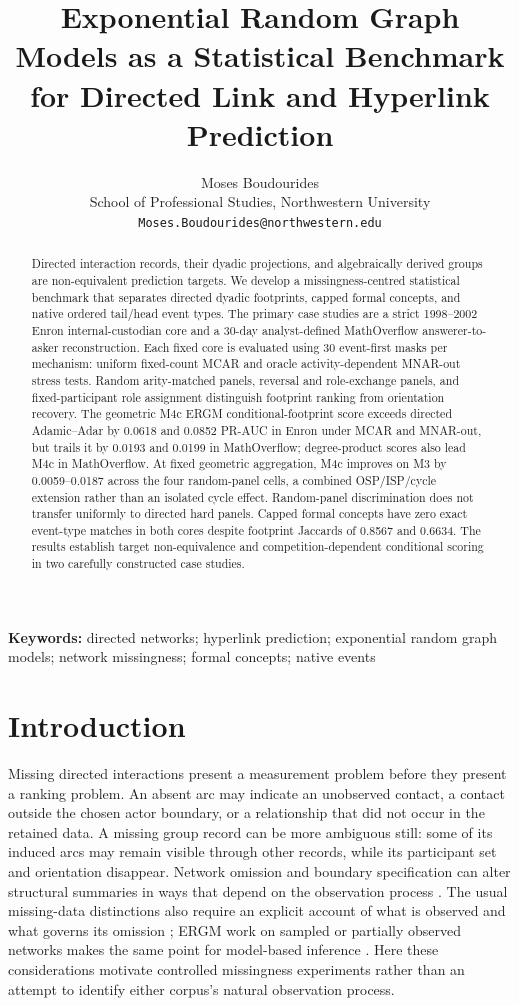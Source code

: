 \documentclass[10pt]{article}
\title{Exponential Random Graph Models as a Statistical Benchmark for Directed Link and Hyperlink Prediction}
\author{Moses Boudourides\\\small School of Professional Studies, Northwestern University\\\small \texttt{Moses.Boudourides@northwestern.edu}}
\date{}
\begin{document}
\maketitle
\begin{abstract}
Directed interaction records, their dyadic projections, and algebraically derived groups are non-equivalent prediction targets. We develop a missingness-centred statistical benchmark that separates directed dyadic footprints, capped formal concepts, and native ordered tail/head event types. The primary case studies are a strict 1998--2002 Enron internal-custodian core and a 30-day analyst-defined MathOverflow answerer-to-asker reconstruction. Each fixed core is evaluated using 30 event-first masks per mechanism: uniform fixed-count MCAR and oracle activity-dependent MNAR-out stress tests. Random arity-matched panels, reversal and role-exchange panels, and fixed-participant role assignment distinguish footprint ranking from orientation recovery. The geometric M4c ERGM conditional-footprint score exceeds directed Adamic--Adar by 0.0618 and 0.0852 PR-AUC in Enron under MCAR and MNAR-out, but trails it by 0.0193 and 0.0199 in MathOverflow; degree-product scores also lead M4c in MathOverflow. At fixed geometric aggregation, M4c improves on M3 by 0.0059--0.0187 across the four random-panel cells, a combined OSP/ISP/cycle extension rather than an isolated cycle effect. Random-panel discrimination does not transfer uniformly to directed hard panels. Capped formal concepts have zero exact event-type matches in both cores despite footprint Jaccards of 0.8567 and 0.6634. The results establish target non-equivalence and competition-dependent conditional scoring in two carefully constructed case studies.
\end{abstract}
\noindent\textbf{Keywords:} directed networks; hyperlink prediction; exponential random graph models; network missingness; formal concepts; native events

\section{Introduction}
Missing directed interactions present a measurement problem before they present a ranking problem. An absent arc may indicate an unobserved contact, a contact outside the chosen actor boundary, or a relationship that did not occur in the retained data. A missing group record can be more ambiguous still: some of its induced arcs may remain visible through other records, while its participant set and orientation disappear. Network omission and boundary specification can alter structural summaries in ways that depend on the observation process \citep{kossinets2006}. The usual missing-data distinctions also require an explicit account of what is observed and what governs its omission \citep{rubin1976}; ERGM work on sampled or partially observed networks makes the same point for model-based inference \citep{handcockGile2010,koskinenEtAl2010}. Here these considerations motivate controlled missingness experiments rather than an attempt to identify either corpus's natural observation process.
\end{document}
